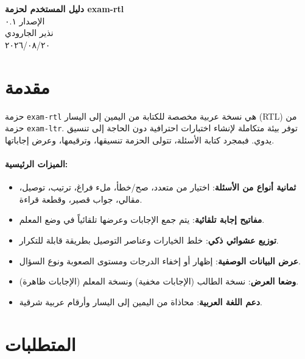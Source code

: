 \documentclass[a4paper]{article}
\newcommand{\engsf}[1]{\textenglish{\textsf{#1}}}
\newcommand{\engtt}[1]{\textenglish{\texttt{#1}}}
\begin{document}
\begin{center}
    {\Large\bfseries دليل المستخدم لحزمة \engsf{exam-rtl}}\\[0.5em]
    {\large الإصدار ٠.١}\\[0.5em] 
    {\large نذير الجارودي}\\[0.5em]
    {\large ٢٠٢٦/٠٨/٢٠}
\end{center}

\tableofcontents

\section{مقدمة}

حزمة \engtt{exam-rtl} هي نسخة عربية مخصصة للكتابة من اليمين إلى اليسار \engsf{(RTL)} من حزمة \engtt{exam-ltr}.
توفر بيئة متكاملة لإنشاء اختبارات احترافية دون الحاجة إلى تنسيق يدوي.  فبمجرد كتابة الأسئلة، تتولى الحزمة تنسيقها، وترقيمها، وعرض إجاباتها.
\paragraph*{الميزات الرئيسية:}

\begin{itemize}
    \item \textbf{ثمانية أنواع من الأسئلة}: اختيار من متعدد، صح/خطأ، ملء فراغ، ترتيب، توصيل، مقالي، جواب قصير، وقطعة قراءة.
    \item \textbf{مفاتيح إجابة تلقائية}: يتم جمع الإجابات وعرضها تلقائياً في وضع المعلم.
    \item \textbf{توزيع عشوائي ذكي}: خلط الخيارات وعناصر التوصيل بطريقة قابلة للتكرار.
    \item \textbf{عرض البيانات الوصفية}: إظهار أو إخفاء الدرجات ومستوى الصعوبة ونوع السؤال.
    \item \textbf{وضعا العرض}: نسخة الطالب (الإجابات مخفية) ونسخة المعلم (الإجابات ظاهرة).
    \item \textbf{دعم اللغة العربية}: محاذاة من اليمين إلى اليسار وأرقام عربية شرقية.
\end{itemize}

\section{المتطلبات}
\end{document}
